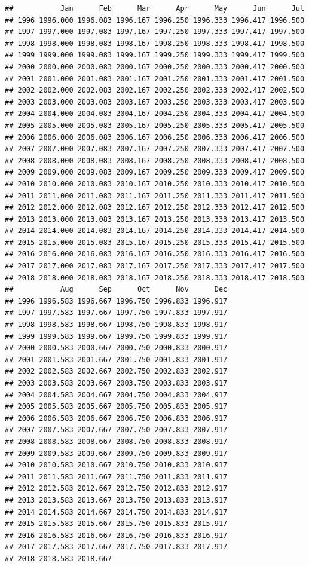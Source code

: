 \documentclass[]{book}
\begin{document}
\begin{verbatim}
##           Jan      Feb      Mar      Apr      May      Jun      Jul
## 1996 1996.000 1996.083 1996.167 1996.250 1996.333 1996.417 1996.500
## 1997 1997.000 1997.083 1997.167 1997.250 1997.333 1997.417 1997.500
## 1998 1998.000 1998.083 1998.167 1998.250 1998.333 1998.417 1998.500
## 1999 1999.000 1999.083 1999.167 1999.250 1999.333 1999.417 1999.500
## 2000 2000.000 2000.083 2000.167 2000.250 2000.333 2000.417 2000.500
## 2001 2001.000 2001.083 2001.167 2001.250 2001.333 2001.417 2001.500
## 2002 2002.000 2002.083 2002.167 2002.250 2002.333 2002.417 2002.500
## 2003 2003.000 2003.083 2003.167 2003.250 2003.333 2003.417 2003.500
## 2004 2004.000 2004.083 2004.167 2004.250 2004.333 2004.417 2004.500
## 2005 2005.000 2005.083 2005.167 2005.250 2005.333 2005.417 2005.500
## 2006 2006.000 2006.083 2006.167 2006.250 2006.333 2006.417 2006.500
## 2007 2007.000 2007.083 2007.167 2007.250 2007.333 2007.417 2007.500
## 2008 2008.000 2008.083 2008.167 2008.250 2008.333 2008.417 2008.500
## 2009 2009.000 2009.083 2009.167 2009.250 2009.333 2009.417 2009.500
## 2010 2010.000 2010.083 2010.167 2010.250 2010.333 2010.417 2010.500
## 2011 2011.000 2011.083 2011.167 2011.250 2011.333 2011.417 2011.500
## 2012 2012.000 2012.083 2012.167 2012.250 2012.333 2012.417 2012.500
## 2013 2013.000 2013.083 2013.167 2013.250 2013.333 2013.417 2013.500
## 2014 2014.000 2014.083 2014.167 2014.250 2014.333 2014.417 2014.500
## 2015 2015.000 2015.083 2015.167 2015.250 2015.333 2015.417 2015.500
## 2016 2016.000 2016.083 2016.167 2016.250 2016.333 2016.417 2016.500
## 2017 2017.000 2017.083 2017.167 2017.250 2017.333 2017.417 2017.500
## 2018 2018.000 2018.083 2018.167 2018.250 2018.333 2018.417 2018.500
##           Aug      Sep      Oct      Nov      Dec
## 1996 1996.583 1996.667 1996.750 1996.833 1996.917
## 1997 1997.583 1997.667 1997.750 1997.833 1997.917
## 1998 1998.583 1998.667 1998.750 1998.833 1998.917
## 1999 1999.583 1999.667 1999.750 1999.833 1999.917
## 2000 2000.583 2000.667 2000.750 2000.833 2000.917
## 2001 2001.583 2001.667 2001.750 2001.833 2001.917
## 2002 2002.583 2002.667 2002.750 2002.833 2002.917
## 2003 2003.583 2003.667 2003.750 2003.833 2003.917
## 2004 2004.583 2004.667 2004.750 2004.833 2004.917
## 2005 2005.583 2005.667 2005.750 2005.833 2005.917
## 2006 2006.583 2006.667 2006.750 2006.833 2006.917
## 2007 2007.583 2007.667 2007.750 2007.833 2007.917
## 2008 2008.583 2008.667 2008.750 2008.833 2008.917
## 2009 2009.583 2009.667 2009.750 2009.833 2009.917
## 2010 2010.583 2010.667 2010.750 2010.833 2010.917
## 2011 2011.583 2011.667 2011.750 2011.833 2011.917
## 2012 2012.583 2012.667 2012.750 2012.833 2012.917
## 2013 2013.583 2013.667 2013.750 2013.833 2013.917
## 2014 2014.583 2014.667 2014.750 2014.833 2014.917
## 2015 2015.583 2015.667 2015.750 2015.833 2015.917
## 2016 2016.583 2016.667 2016.750 2016.833 2016.917
## 2017 2017.583 2017.667 2017.750 2017.833 2017.917
## 2018 2018.583 2018.667
\end{verbatim}
\end{document}
